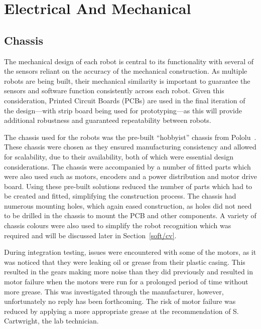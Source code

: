 
\chapter{Electrical And Mechanical}\label{electrical}

\section{Chassis}\label{mech/chassis}
The mechanical design of each robot is central to its
functionality with several of the sensors
reliant on the accuracy of the mechanical construction. As
multiple robots are being built,
their mechanical similarity is important to guarantee the
sensors and software function consistently across each robot.
Given this consideration, Printed Circuit Boards (PCBs) are used in
the final iteration of the design---with strip board being used for
prototyping---as this will provide additional robustness and
guaranteed repeatability between robots.

The chassis used for the robots was the pre-built ``hobbyist''
chassis from Pololu~\cite{pololuchassis}. These chassis were
chosen as they ensured manufacturing consistency and allowed
for scalability, due to their availability, both of which were
essential design considerations. The chassis were accompanied by
a number of fitted parts which were also used such as motors,
encoders and a power distribution and motor drive board. Using these pre-built
solutions reduced the number of parts which had to be created
and fitted, simplifying the construction process.
The chassis had numerous mounting holes, which again eased
construction, as holes did not need to be drilled in the chassis
to mount the PCB and other components. A variety of chassis
colours were also used to simplify the robot recognition which
was required and will be discussed later in Section~\ref{soft/cv}.

During integration testing, issues were encountered with some of the motors,
as it was noticed that they
were leaking oil or grease from their plastic casing. This
resulted in the gears making more noise than they did previously
and resulted in motor failure when the motors were run for a
prolonged period of time without more grease. This was
investigated through the manufacturer, however, unfortunately no
reply has been forthcoming. The risk of motor failure was
reduced by applying a more appropriate grease at the
recommendation of S. Cartwright, the lab technician.

